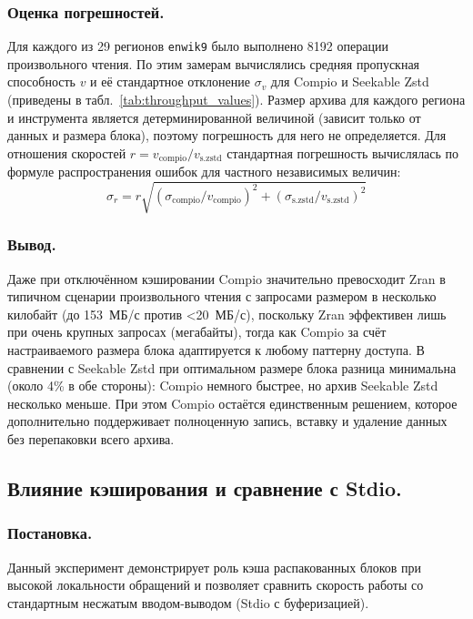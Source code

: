 \subsubsection{Оценка погрешностей.}
Для каждого из 29 регионов \texttt{enwik9} было выполнено 8192 операции произвольного чтения. По этим замерам вычислялись средняя пропускная способность $v$ и её стандартное отклонение $\sigma_v$ для Compio и Seekable Zstd (приведены в табл.~\ref{tab:throughput_values}). Размер архива для каждого региона и инструмента является детерминированной величиной (зависит только от данных и размера блока), поэтому погрешность для него не определяется. Для отношения скоростей $r = v_{\text{compio}} / v_{\text{s.zstd}}$ стандартная погрешность вычислялась по формуле распространения ошибок для частного независимых величин: 
\[
\sigma_r = r \sqrt{(\sigma_{\text{compio}} / v_{\text{compio}})^2 + (\sigma_{\text{s.zstd}} / v_{\text{s.zstd}})^2}
\]

\subsubsection{Вывод.}
Даже при отключённом кэшировании Compio значительно превосходит Zran в типичном сценарии произвольного чтения с запросами размером в несколько килобайт (до 153~МБ/с против <20~МБ/с), поскольку Zran эффективен лишь при очень крупных запросах (мегабайты), тогда как Compio за счёт настраиваемого размера блока адаптируется к любому паттерну доступа. В сравнении с Seekable Zstd при оптимальном размере блока разница минимальна (около 4\% в обе стороны): Compio немного быстрее, но архив Seekable Zstd несколько меньше. При этом Compio остаётся единственным решением, которое дополнительно поддерживает полноценную запись, вставку и удаление данных без перепаковки всего архива.

\subsection{Влияние кэширования и сравнение с Stdio.} \label{cache-impact}

\subsubsection{Постановка.}
Данный эксперимент демонстрирует роль кэша распакованных блоков при высокой локальности обращений и позволяет сравнить скорость работы со стандартным несжатым вводом-выводом (Stdio с буферизацией).

